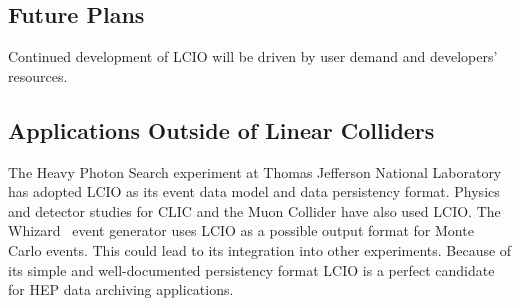 \subsection{Future Plans}
Continued development of LCIO will be driven by user demand and developers' resources.

\subsection{Applications Outside of Linear Colliders}
The Heavy Photon Search experiment at Thomas Jefferson National Laboratory
has adopted LCIO as its event data model and data persistency format. Physics
and detector studies for CLIC and the Muon Collider have also used LCIO.
The Whizard~\cite{whizardWebsite} event generator uses LCIO as a possible output format for Monte Carlo events. This could lead
to its integration into other experiments. Because of its simple and
well-documented persistency format LCIO is a perfect candidate for HEP data
archiving applications.
